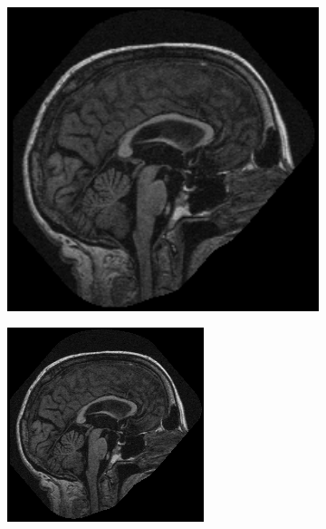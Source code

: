 \begin{figure}
	\centering
	\begin{subfigure}{.23\textwidth}
		\centering\includegraphics[width=1.014\textwidth]{images/1.png}
	\end{subfigure}
	\begin{subfigure}{.23\textwidth}
		\centering\includegraphics[width=\textwidth]{images/2.png}
	\end{subfigure}
	

\end{figure}
